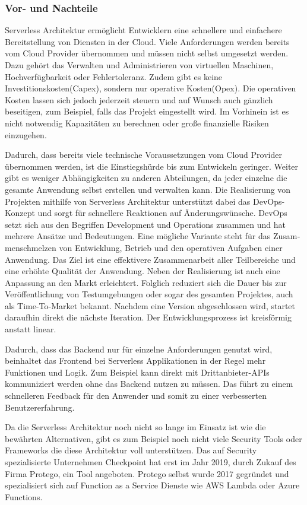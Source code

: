 \subsubsection{Vor- und Nachteile}
Serverless Architektur ermöglicht Entwicklern eine schnellere und einfachere Bereitstellung von Diensten in der Cloud.
Viele Anforderungen werden bereits vom Cloud Provider übernommen und müssen nicht selbst umgesetzt werden.
Dazu gehört das Verwalten und Administrieren von virtuellen Maschinen, Hochverfügbarkeit oder Fehlertoleranz.
Zudem gibt es keine Investitionskosten(Capex), sondern nur operative Kosten(Opex).
Die operativen Kosten lassen sich jedoch jederzeit steuern und auf Wunsch auch gänzlich beseitigen, zum Beispiel, falls das Projekt eingestellt wird.
Im Vorhinein ist es nicht notwendig Kapazitäten zu berechnen oder große finanzielle Risiken einzugehen.

Dadurch, dass bereits viele technische Voraussetzungen vom Cloud Provider übernommen werden, ist die Einstiegshürde bis zum Entwickeln geringer.
Weiter gibt es weniger Abhängigkeiten zu anderen Abteilungen, da jeder einzelne die gesamte Anwendung selbst erstellen und verwalten kann.
Die Realisierung von Projekten mithilfe von Serverless Architektur unterstützt dabei das DevOps-Konzept und sorgt für schnellere Reaktionen auf Änderungswünsche.
DevOps setzt sich aus den Begriffen Development und Operations zusammen und hat mehrere Ansätze und Bedeutungen.
Eine mögliche Variante steht für das Zu­sam­men­schmel­zen von Entwicklung, Betrieb und den operativen Aufgaben einer Anwendung.
Das Ziel ist eine effektivere Zusammenarbeit aller Teilbereiche und eine erhöhte Qualität der Anwendung.
Neben der Realisierung ist auch eine Anpassung an den Markt erleichtert.
Folglich reduziert sich die Dauer bis zur Veröffentlichung von Testumgebungen oder sogar des gesamten Projektes, auch als Time-To-Market bekannt.
Nachdem eine Version abgeschlossen wird, startet daraufhin direkt die nächste Iteration.
Der Entwicklungsprozess ist kreisförmig anstatt linear.
\cite{DevOps}

Dadurch, dass das Backend nur für einzelne Anforderungen genutzt wird, beinhaltet das Frontend bei Serverless Applikationen in der Regel mehr Funktionen und Logik.
Zum Beispiel kann direkt mit Drittanbieter-APIs kommuniziert werden ohne das Backend nutzen zu müssen.
Das führt zu einem schnelleren Feedback für den Anwender und somit zu einer verbesserten Benutzererfahrung.

Da die Serverless Architektur noch nicht so lange im Einsatz ist wie die bewährten Alternativen, gibt es zum Beispiel noch nicht viele Security Tools oder Frameworks die diese Architektur voll unterstützen.
Das auf Security spezialisierte Unternehmen Checkpoint hat erst im Jahr 2019, durch Zukauf des Firma Protego, ein Tool angeboten.
Protego selbst wurde 2017 gegründet und spezialisiert sich auf Function as a Service Dienste wie AWS Lambda oder Azure Functions. \cite{Checkpoint}

